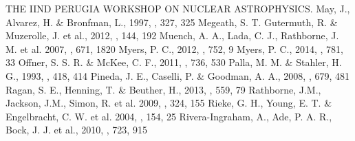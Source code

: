 \documentclass[iop]{emulateapj}
\begin{document}
\begin{thebibliography}{}
  THE IIND PERUGIA WORKSHOP ON NUCLEAR ASTROPHYSICS.
 May, J., Alvarez, H. \& Bronfman, L., 1997, \aap, 327, 325
 Megeath, S. T. Gutermuth, R. \& Muzerolle, J. et al., 2012, \aj, 144, 192
 Muench, A. A., Lada, C. J., Rathborne, J. M. et al. 2007, \apj, 671, 1820
 Myers, P. C., 2012, \apj, 752, 9
 Myers, P. C., 2014, \apj, 781, 33
 Offner, S. S. R. \& McKee, C. F., 2011, \apj, 736, 530
 Palla, M. M. \&  Stahler, H. G., 1993, \apj, 418, 414
 Pineda, J. E., Caselli, P. \& Goodman, A. A., 2008, \apj, 679, 481
 Ragan, S. E., Henning, T. \& Beuther, H., 2013, \aap, 559, 79
 Rathborne, J.M., Jackson, J.M., Simon, R. et al. 2009, \apss, 324, 155
 Rieke, G. H., Young, E. T. \& Engelbracht, C. W. et al. 2004, \apjs, 154, 25
 Rivera-Ingraham, A., Ade, P. A. R., Bock, J. J. et al., 2010, \apj, 723, 915


\end{thebibliography}
\end{document}
